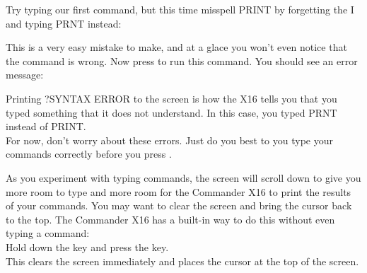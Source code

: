 Try typing our first command, but this time misspell {\ttfamily PRINT} by
forgetting the {\ttfamily I} and typing {\ttfamily PRNT} instead:


This is a very easy mistake to make, and at a glace you won't even notice that
the command is wrong.  Now press  to run this command.  You
should see an error message:

{
	\raggedleft
}


Printing {\ttfamily ?SYNTAX ERROR} to the screen is how the X16 tells you that
you typed something that it does not understand.  In this case, you typed
{\ttfamily PRNT} instead of {\ttfamily PRINT}.\\

For now, don't worry about these errors.  Just do you best to you type your
commands correctly before you press .

As you experiment with typing commands, the screen will scroll down to give you
more room to type and more room for the Commander X16 to print the results of
your commands.  You may want to clear the screen and bring the cursor back to
the top.  The Commander X16 has a built-in way to do this without even typing a
command:\\

Hold down the  key and press the  key.\\

This clears the screen immediately and places the cursor at the top of the
screen.\\


